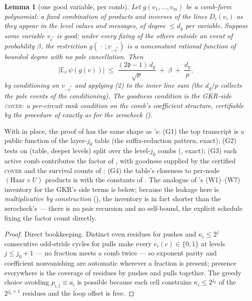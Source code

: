 \documentclass{article}
\newcommand{\extdeg}{\mathfrak{d}}
\newtheorem{lemma}[theorem]{Lemma}
\theoremstyle{definition}
\begin{document}
\begin{lemma}[one good variable, per comb]\label{lem:goodvar}
Let $g(v_1, \dots, v_m)$ be a comb-form polynomial: a fixed combination of products and inverses of the lines $D_i(v_i)$ as they appear in the level values and messages, of degree $\leq d_g$ per variable. Suppose some variable $v_{i^*}$ is \emph{good}: under every fixing of the others outside an event of probability $\beta$, the restriction $g(\,\cdot\,; v_{-i^*})$ is a nonconstant rational function of bounded degree with no pole cancellation. Then
\[
\big|\mathbb{E}_v\, \psi(g(v))\big| \;\leq\; \frac{(2\extdeg - 1)\,d_g}{\sqrt p} \;+\; \beta \;+\; \frac{d_g}{p} ,
\]
by conditioning on $v_{-i^*}$ and applying (2) to the inner line sum (the $d_g/p$ collects the pole events of the conditioning). The goodness condition is the GKR-side \textsc{cover}: a per-circuit rank condition on the comb's coefficient structure, certifiable by the procedure of  exactly as for the zerocheck ().
\end{lemma}

With  in place, the proof of  has the same shape as 's: (G1) the top transcript is a public function of the layer-$j_0$ table (the suffix-reduction pattern, exact); (G2) tests on (table, deeper levels) split over the level-$j_0$ combs (, exact); (G3) each active comb contributes the factor of , with goodness supplied by the certified \textsc{cover} and the survival counts of ; (G4) the table's closeness to per-node $(\mathrm{Haar} \times U)$ products is  with the constants of . The analogue of 's (W1)--(W7) inventory for the GKR's side terms is  below; because the leakage here is \emph{multiplicative by construction} (), the inventory is in fact shorter than the zerocheck's --- there is no pair recursion and no self-bound, the explicit schedule fixing the factor count directly.

\begin{proof}
Direct bookkeeping. Distinct even residues for pushes and $\kappa_i \leq 2^{j}$ consecutive odd-stride cycles for pulls make every $e_i(c) \in \{0, 1\}$ at levels $j \leq j_0+1$ --- no fraction meets a comb twice --- so exponent parity and coefficient nonvanishing are automatic wherever a fraction is present; presence everywhere is the coverage of residues by pushes and pulls together. The greedy choice avoiding $p_{i,l} \equiv a_i$ is possible because each cell constrains $\kappa_i \leq 2^{j_0}$ of the $2^{j_0+1}$ residues and the loop offset is free.
\end{proof}
\end{document}
